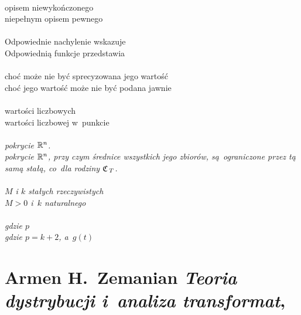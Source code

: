 \documentclass[a4paper,11pt]{article}
\numberwithin{equation}{section}
\begin{document}
\noindent
{} \\
\Jest opisem niewykończonego \\
\PowinnoByc niepełnym opisem pewnego \\
 \\
\Jest Odpowiednie nachylenie wskazuje \\
\PowinnoByc Odpowiednią funkcje przedstawia \\
 \\
\Jest choć może nie być sprecyzowana jego wartość \\
\PowinnoByc choć jego wartość może nie być podana jawnie \\
 \\
\Jest wartości liczbowych \\
\PowinnoByc wartości liczbowej w~punkcie \\
 \\
\Jest \textit{pokrycie $\mathbb{R}^{ n }$.} \\
\PowinnoByc \textit{pokrycie $\mathbb{R}^{ n }$, przy czym średnice wszystkich
  jego zbiorów, są~ograniczone przez tą samą stałą, co~dla rodziny
  $\mathfrak{C}_{ \hspace{0.17em} T }$.} \\
 \\
\Jest \textit{$M$ i $k$ stałych rzeczywistych} \\
\PowinnoByc \textit{$M > 0$ i~$k$ naturalnego} \\
 \\
\Jest \textit{gdzie $p$} \\
\PowinnoByc \textit{gdzie $p = k + 2$, a~$g( t )$} \\







\newpage

\section{Armen H.~Zemanian \textit{Teoria dystrybucji i~analiza transformat},
  \parencite{Zemanian-Teoria-dystrybucji-ETC-Pub-1969}}


\end{document}
